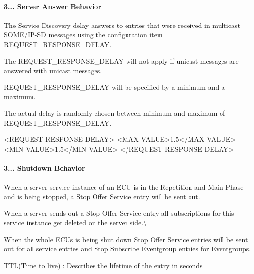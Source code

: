 \paragraph*{3... Server Answer Behavior}


\begin{DoxyItemize}
\item The Service Discovery delay answers to entries that were received in multicast S\+O\+M\+E/\+I\+P-\/\+SD messages using the configuration item R\+E\+Q\+U\+E\+S\+T\+\_\+\+R\+E\+S\+P\+O\+N\+S\+E\+\_\+\+D\+E\+L\+AY.
\item The R\+E\+Q\+U\+E\+S\+T\+\_\+\+R\+E\+S\+P\+O\+N\+S\+E\+\_\+\+D\+E\+L\+AY will not apply if unicast messages are answered with unicast messages.
\item R\+E\+Q\+U\+E\+S\+T\+\_\+\+R\+E\+S\+P\+O\+N\+S\+E\+\_\+\+D\+E\+L\+AY will be specified by a minimum and a maximum.
\item The actual delay is randomly chosen between minimum and maximum of R\+E\+Q\+U\+E\+S\+T\+\_\+\+R\+E\+S\+P\+O\+N\+S\+E\+\_\+\+D\+E\+L\+AY. 
\begin{DoxyCode}
<\textcolor{keywordtype}{REQUEST-RESPONSE-DELAY}>
  <\textcolor{keywordtype}{MAX-VALUE}>1.5</\textcolor{keywordtype}{MAX-VALUE}>
  <\textcolor{keywordtype}{MIN-VALUE}>1.5</\textcolor{keywordtype}{MIN-VALUE}>
</\textcolor{keywordtype}{REQUEST-RESPONSE-DELAY}>
\end{DoxyCode}

\end{DoxyItemize}

\paragraph*{3... Shutdown Behavior}


\begin{DoxyItemize}
\item When a server service instance of an E\+CU is in the Repetition and Main Phase and is being stopped, a Stop Offer Service entry will be sent out.
\item When a server sends out a Stop Offer Service entry all subscriptions for this service instance get deleted on the server side.\textbackslash{}
\item When the whole E\+C\+Us is being shut down Stop Offer Service entries will be sent out for all service entries and Stop Subscribe Eventgroup entries for Eventgroups.
\item T\+T\+L(\+Time to live) \+: Describes the lifetime of the entry in seconds
\end{DoxyItemize}


